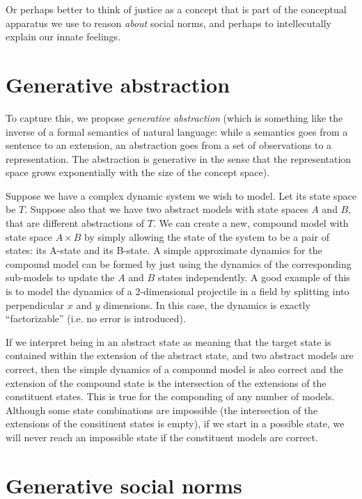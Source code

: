 \documentclass[a4paper]{article}
\begin{document}
Or perhaps better to think of justice as a concept that is part of the conceptual apparatus we use to reason \textit{about} social norms, and perhaps to intellecutally explain our innate feelings.

\section{Generative abstraction}

To capture this, we propose \textit{generative abstraction} (which is something like the inverse of a formal semantics of natural language: while a semantics goes from a sentence to an extension, an abstraction goes from a set of observations to a representation. The abstraction is generative in the sense that the representation space grows exponentially with the size of the concept space). 

Suppose we have a complex dynamic system we wish to model. Let its state space be $T$. Suppose also that we have two abstract models with state spaces $A$ and $B$, that are different abstractions of $T$. We can create a new, compound model with state space $A \times B$ by simply allowing the state of the system to be a pair of states: its A-state and its B-state. A simple approximate dynamics for the compound model can be formed by just using the dynamics of the corresponding sub-models to update the $A$ and $B$ states independently. A good example of this is to model the dynamics of a 2-dimensional projectile in a field by splitting into perpendicular $x$ and $y$ dimensions. In this case, the dynamics is exactly ``factorizable'' (i.e. no error is introduced). 


If we interpret being in an abstract state as meaning that the target state is contained within the extension of the abstract state, and two abstract models are correct, then the simple dynamics of a compound model is also correct and the extension of the compound state is the intersection of the extensions of the constituent states. This is true for the componding of any number of models. Although some state combinations are impossible (the intersection of the extensions of the consitiuent states is empty), if we start in a possible state, we will never reach an impossible state if the constituent models are correct.

\section{Generative social norms}
\end{document}
